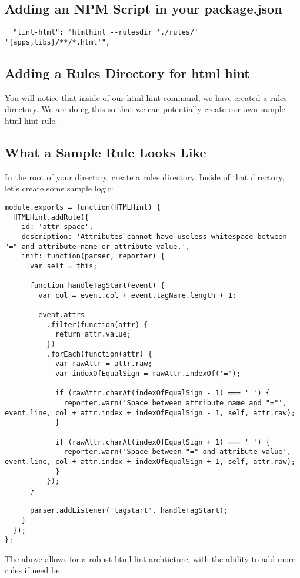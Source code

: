 \subsection{Adding an NPM Script in your package.json}
\begin{verbatim}
  "lint-html": "htmlhint --rulesdir './rules/' '{apps,libs}/**/*.html'",
\end{verbatim}

\subsection{Adding a Rules Directory for html hint}
You will notice that inside of our html hint command, we have created a rules
directory. We are doing this so that we can potentially create our own sample
html hint rule.

\subsection{What a Sample Rule Looks Like}
In the root of your directory, create a rules directory. Inside of that
directory, let's create some sample logic:
\begin{lstlisting}
module.exports = function(HTMLHint) {
  HTMLHint.addRule({
    id: 'attr-space',
    description: 'Attributes cannot have useless whitespace between "=" and attribute name or attribute value.',
    init: function(parser, reporter) {
      var self = this;

      function handleTagStart(event) {
        var col = event.col + event.tagName.length + 1;

        event.attrs
          .filter(function(attr) {
            return attr.value;
          })
          .forEach(function(attr) {
            var rawAttr = attr.raw;
            var indexOfEqualSign = rawAttr.indexOf('=');

            if (rawAttr.charAt(indexOfEqualSign - 1) === ' ') {
              reporter.warn('Space between attribute name and "="', event.line, col + attr.index + indexOfEqualSign - 1, self, attr.raw);
            }

            if (rawAttr.charAt(indexOfEqualSign + 1) === ' ') {
              reporter.warn('Space between "=" and attribute value', event.line, col + attr.index + indexOfEqualSign + 1, self, attr.raw);
            }
          });
      }

      parser.addListener('tagstart', handleTagStart);
    }
  });
};
\end{lstlisting}

The above allows for a robust html lint archticture, with the ability to add
more rules if need be.
